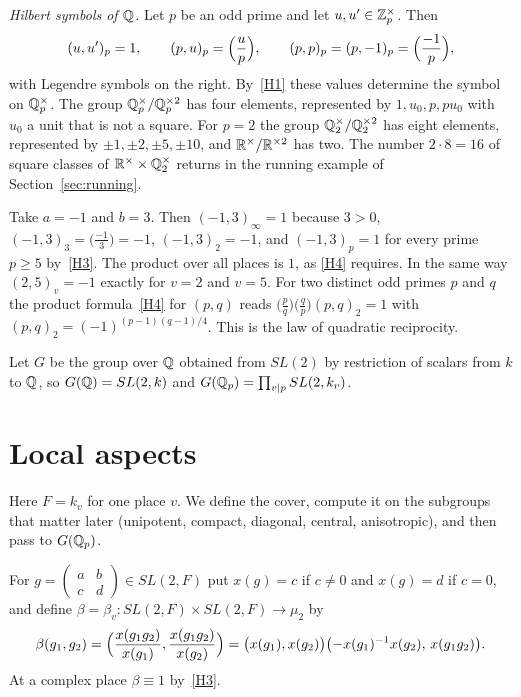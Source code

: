 \begin{example}\label{ex:hilbert}
\emph{Hilbert symbols of $\mathbb{Q}$.} Let $p$ be an odd prime and let
$u,u'\in\mathbb{Z}_p^\times$. Then
\[
(u,u')_p=1,\qquad(p,u)_p=\Bigl(\frac up\Bigr),\qquad
(p,p)_p=(p,-1)_p=\Bigl(\frac{-1}p\Bigr),
\]
with Legendre symbols on the right. By~\ref{H1} these values determine
the symbol on $\mathbb{Q}_p^\times$. The group $\mathbb{Q}_p^\times/\mathbb{Q}_p^{\times2}$ has
four elements, represented by $1,u_0,p,pu_0$ with $u_0$ a unit that is
not a square. For $p=2$ the group $\mathbb{Q}_2^\times/\mathbb{Q}_2^{\times2}$ has eight
elements, represented by $\pm1,\pm2,\pm5,\pm10$, and
$\mathbb{R}^\times/\mathbb{R}^{\times2}$ has two. The number $2\cdot8=16$ of square
classes of $\mathbb{R}^\times\times\mathbb{Q}_2^\times$ returns in the running example of
Section~\ref{sec:running}.

Take $a=-1$ and $b=3$. Then $(-1,3)_\infty=1$ because $3>0$,
$(-1,3)_3=\bigl(\frac{-1}3\bigr)=-1$, $(-1,3)_2=-1$, and $(-1,3)_p=1$ for
every prime $p\ge5$ by~\ref{H3}. The product over all places is $1$, as
\ref{H4} requires. In the same way $(2,5)_v=-1$ exactly for $v=2$ and
$v=5$. For two distinct odd primes $p$ and $q$ the product
formula~\ref{H4} for $(p,q)$ reads $\bigl(\frac pq\bigr)\bigl(\frac qp
\bigr)(p,q)_2=1$ with $(p,q)_2=(-1)^{(p-1)(q-1)/4}$. This is the law of
quadratic reciprocity.
\end{example}

Let $G$ be the group over $\mathbb{Q}$ obtained from $SL(2)$ by restriction of
scalars from $k$ to $\mathbb{Q}$, so $G(\mathbb{Q})=SL(2,k)$ and
$G(\mathbb{Q}_p)=\prod_{v\mid p}SL(2,k_v)$.

\section{Local aspects}\label{sec:local}

Here $F=k_v$ for one place $v$. We define the cover, compute it on the
subgroups that matter later (unipotent, compact, diagonal, central,
anisotropic), and then pass to $G(\mathbb{Q}_p)$.

For $g=\begin{pmatrix}a&b\\c&d\end{pmatrix}\in SL(2,F)$ put
$x(g)=c$ if $c\neq0$ and $x(g)=d$ if $c=0$, and define
$\beta=\beta_v\colon SL(2,F)\times SL(2,F)\to\mu_2$ by
\begin{equation}\label{eq:beta}
\beta(g_1,g_2)
=\Bigl(\frac{x(g_1g_2)}{x(g_1)},\frac{x(g_1g_2)}{x(g_2)}\Bigr)
=\bigl(x(g_1),x(g_2)\bigr)\bigl(-x(g_1)^{-1}x(g_2),\,x(g_1g_2)\bigr).
\end{equation}
At a complex place $\beta\equiv1$ by~\ref{H3}.

